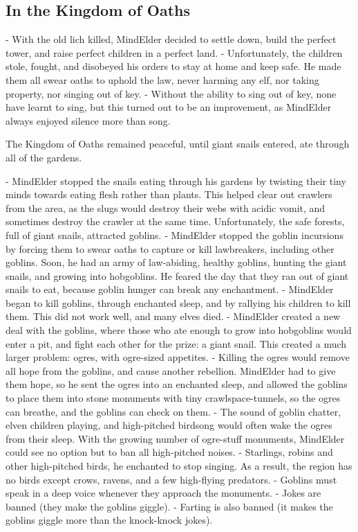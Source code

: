 \subsection{In the Kingdom of Oaths}

- With the old lich killed, MindElder decided to settle down, build the perfect tower, and raise perfect children in a perfect land.
- Unfortunately, the children stole, fought, and disobeyed his orders to stay at home and keep safe.  He made them all swear oaths to uphold the law, never harming any elf, nor taking property, nor singing out of key.
- Without the ability to sing out of key, none have learnt to sing, but this turned out to be an improvement, as MindElder always enjoyed silence more than song.

The Kingdom of Oaths remained peaceful, until giant snails entered, ate through all of the gardens.


- MindElder stopped the snails eating through his gardens by twisting their tiny minds towards eating flesh rather than plants.  This helped clear out \glspl{crawler} from the area, as the slugs would destroy their webs with acidic vomit, and sometimes destroy the \gls{crawler} at the same time.  Unfortunately, the safe forests, full of giant snails, attracted goblins.
- MindElder stopped the goblin incursions by forcing them to swear oaths to capture or kill lawbreakers, including other goblins.  Soon, he had an army of law-abiding, healthy goblins, hunting the giant snails, and growing into hobgoblins.  He feared the day that they ran out of giant snails to eat, because goblin hunger can break any enchantment.
- MindElder began to kill goblins, through enchanted sleep, and by rallying his children to kill them.  This did not work well, and many elves died.
- MindElder created a new deal with the goblins, where those who ate enough to grow into hobgoblins would enter a pit, and fight each other for the prize: a giant snail.  This created a much larger problem: ogres, with ogre-sized appetites.
- Killing the ogres would remove all hope from the goblins, and cause another rebellion.  MindElder had to give them hope, so he sent the ogres into an enchanted sleep, and allowed the goblins to place them into stone monuments with tiny crawlspace-tunnels, so the ogres can breathe, and the goblins can check on them.
- The sound of goblin chatter, elven children playing, and high-pitched birdsong would often wake the ogres from their sleep.  With the growing number of ogre-stuff monuments, MindElder could see no option but to ban all high-pitched noises.
    - Starlings, robins and other high-pitched birds, he enchanted to stop singing.  As a result, the region has no birds except crows, ravens, and a few high-flying predators.
    - Goblins must speak in a deep voice whenever they approach the monuments.
    - Jokes are banned (they make the goblins giggle).
    - Farting is also banned (it makes the goblins giggle more than the knock-knock jokes).



